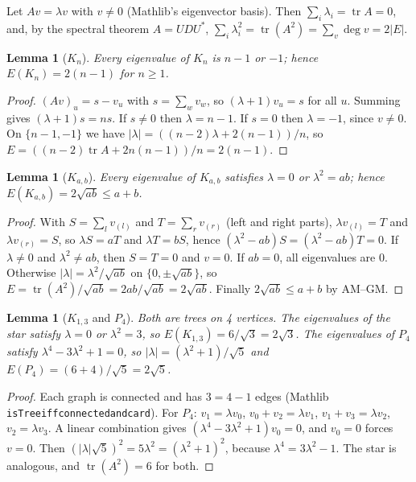 \documentclass[11pt]{article}
\renewcommand{\_}{\oldus\allowbreak}
\newtheorem{lemma}[theorem]{Lemma}
\theoremstyle{definition}
\theoremstyle{remark}
\begin{document}
Let $Av=\lambda v$ with $v\neq 0$ (Mathlib's eigenvector basis). Then $\sum_i\lambda_i=\operatorname{tr}A=0$,
and, by the spectral theorem $A=UDU^*$, $\sum_i\lambda_i^2=\operatorname{tr}(A^2)=\sum_v\deg v=2|E|$.

\begin{lemma}[$K_n$]
Every eigenvalue of $K_n$ is $n-1$ or $-1$; hence $E(K_n)=2(n-1)$ for $n\ge1$.
\end{lemma}
\begin{proof}
$(Av)_u=s-v_u$ with $s=\sum_w v_w$, so $(\lambda+1)v_u=s$ for all $u$. Summing gives $(\lambda+1)s=ns$. If
$s\neq0$ then $\lambda=n-1$. If $s=0$ then $\lambda=-1$, since $v\neq0$. On $\{n-1,-1\}$ we have
$|\lambda|=((n-2)\lambda+2(n-1))/n$, so $E=((n-2)\operatorname{tr}A+2n(n-1))/n=2(n-1)$.
\end{proof}

\begin{lemma}[$K_{a,b}$]
Every eigenvalue of $K_{a,b}$ satisfies $\lambda=0$ or $\lambda^2=ab$; hence $E(K_{a,b})=2\sqrt{ab}\le a+b$.
\end{lemma}
\begin{proof}
With $S=\sum_l v_{(l)}$ and $T=\sum_r v_{(r)}$ (left and right parts), $\lambda v_{(l)}=T$ and
$\lambda v_{(r)}=S$, so $\lambda S=aT$ and $\lambda T=bS$, hence $(\lambda^2-ab)S=(\lambda^2-ab)T=0$. If
$\lambda\neq0$ and $\lambda^2\neq ab$, then $S=T=0$ and $v=0$. If $ab=0$, all eigenvalues are $0$. Otherwise
$|\lambda|=\lambda^2/\sqrt{ab}$ on $\{0,\pm\sqrt{ab}\}$, so $E=\operatorname{tr}(A^2)/\sqrt{ab}=2ab/\sqrt{ab}=
2\sqrt{ab}$. Finally $2\sqrt{ab}\le a+b$ by AM--GM.
\end{proof}

\begin{lemma}[$K_{1,3}$ and $P_4$]
Both are trees on 4 vertices. The eigenvalues of the star satisfy $\lambda=0$ or $\lambda^2=3$, so
$E(K_{1,3})=6/\sqrt3=2\sqrt3$. The eigenvalues of $P_4$ satisfy $\lambda^4-3\lambda^2+1=0$, so
$|\lambda|=(\lambda^2+1)/\sqrt5$ and $E(P_4)=(6+4)/\sqrt5=2\sqrt5$.
\end{lemma}
\begin{proof}
Each graph is connected and has $3=4-1$ edges (Mathlib \texttt{isTree\_iff\_connected\_and\_card}). For
$P_4$: $v_1=\lambda v_0$, $v_0+v_2=\lambda v_1$, $v_1+v_3=\lambda v_2$, $v_2=\lambda v_3$. A linear combination
gives $(\lambda^4-3\lambda^2+1)v_0=0$, and $v_0=0$ forces $v=0$. Then $(|\lambda|\sqrt5)^2=5\lambda^2=
(\lambda^2+1)^2$, because $\lambda^4=3\lambda^2-1$. The star is analogous, and $\operatorname{tr}(A^2)=6$ for
both.
\end{proof}
\end{document}

